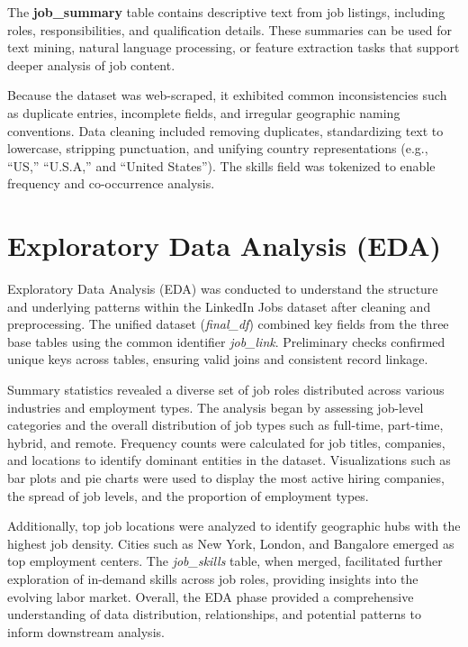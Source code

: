 \documentclass[conference]{IEEEtran}
\begin{document}
The \textbf{job\_summary} table contains descriptive text from job listings, including roles, responsibilities, and qualification details. These summaries can be used for text mining, natural language processing, or feature extraction tasks that support deeper analysis of job content.

Because the dataset was web-scraped, it exhibited common inconsistencies such as duplicate entries, incomplete fields, and irregular geographic naming conventions. Data cleaning included removing duplicates, standardizing text to lowercase, stripping punctuation, and unifying country representations (e.g., “US,” “U.S.A,” and “United States”). The skills field was tokenized to enable frequency and co-occurrence analysis.


\section{Exploratory Data Analysis (EDA)}
Exploratory Data Analysis (EDA) was conducted to understand the structure and underlying patterns within the LinkedIn Jobs dataset after cleaning and preprocessing. The unified dataset (\textit{final\_df}) combined key fields from the three base tables using the common identifier \textit{job\_link}. Preliminary checks confirmed unique keys across tables, ensuring valid joins and consistent record linkage.

Summary statistics revealed a diverse set of job roles distributed across various industries and employment types. The analysis began by assessing job-level categories and the overall distribution of job types such as full-time, part-time, hybrid, and remote. Frequency counts were calculated for job titles, companies, and locations to identify dominant entities in the dataset. Visualizations such as bar plots and pie charts were used to display the most active hiring companies, the spread of job levels, and the proportion of employment types.

Additionally, top job locations were analyzed to identify geographic hubs with the highest job density. Cities such as New York, London, and Bangalore emerged as top employment centers. The \textit{job\_skills} table, when merged, facilitated further exploration of in-demand skills across job roles, providing insights into the evolving labor market. Overall, the EDA phase provided a comprehensive understanding of data distribution, relationships, and potential patterns to inform downstream analysis.
\end{document}
